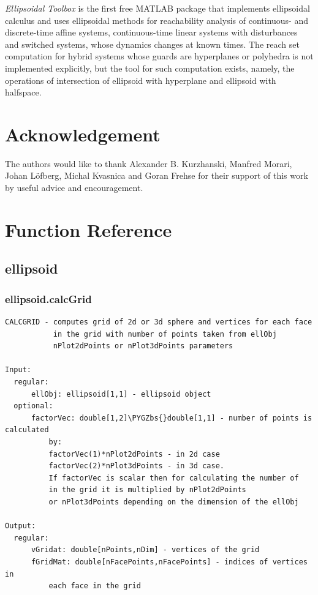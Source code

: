 \documentclass[letterpaper,10pt,english]{sphinxmanual}
\def\PYGZbs{\char`\\}
\begin{document}
\emph{Ellipsoidal Toolbox} is the first free MATLAB package that implements
ellipsoidal calculus and uses ellipsoidal methods for reachability
analysis of continuous- and discrete-time affine systems,
continuous-time linear systems with disturbances and switched systems,
whose dynamics changes at known times. The reach set computation for
hybrid systems whose guards are hyperplanes or polyhedra is not
implemented explicitly, but the tool for such computation exists,
namely, the operations of intersection of ellipsoid with hyperplane and
ellipsoid with halfspace.


\chapter{Acknowledgement}
\label{chap_acknowledge::doc}\label{chap_acknowledge:acknowledgement}
The authors would like to thank Alexander B. Kurzhanski, Manfred Morari,
Johan Löfberg, Michal Kvasnica and Goran Frehse for their support of
this work by useful advice and encouragement.


\chapter{Function Reference}
\label{chap_functions::doc}\label{chap_functions:function-reference}

\section{ellipsoid}
\label{chap_functions:ellipsoid}

\subsection{ellipsoid.calcGrid}
\label{chap_functions:ellipsoid-calcgrid}
\begin{Verbatim}[commandchars=\\\{\}]
CALCGRID - computes grid of 2d or 3d sphere and vertices for each face
           in the grid with number of points taken from ellObj
           nPlot2dPoints or nPlot3dPoints parameters

Input:
  regular:
      ellObj: ellipsoid[1,1] - ellipsoid object
  optional:
      factorVec: double[1,2]\PYGZbs{}double[1,1] - number of points is calculated
          by:
          factorVec(1)*nPlot2dPoints - in 2d case
          factorVec(2)*nPlot3dPoints - in 3d case.
          If factorVec is scalar then for calculating the number of
          in the grid it is multiplied by nPlot2dPoints
          or nPlot3dPoints depending on the dimension of the ellObj

Output:
  regular:
      vGridat: double[nPoints,nDim] - vertices of the grid
      fGridMat: double[nFacePoints,nFacePoints] - indices of vertices in
          each face in the grid
\end{Verbatim}
\end{document}
